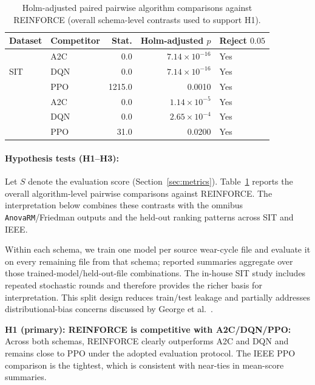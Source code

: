 \documentclass[sn-basic]{sn-jnl} %
\newcommand{\faintcmidrule}[1]{%
	\arrayrulecolor{black!30}%
	\cmidrule{#1}%
	\arrayrulecolor{black}%
}
\begin{document}
\begin{table}[htbp]
	\centering
	\caption{Holm-adjusted paired pairwise algorithm comparisons against \textsc{REINFORCE} (overall schema-level contrasts used to support H1).}
	\label{tab:hyp_tests}
	\begin{tabular}{l l r r l}
	\toprule
	\textbf{Dataset} & \textbf{Competitor} & \textbf{Stat.} & \textbf{Holm-adjusted $p$} & \textbf{Reject $0.05$}\\
	\midrule
	\multirow{3}{*}{SIT}
		& A2C & 0.0 & $7.14\times 10^{-16}$ & Yes\\
		& DQN & 0.0 & $7.14\times 10^{-16}$ & Yes\\
		& PPO & 1215.0 & 0.0010 & Yes\\
	\faintcmidrule{1-5}
	\multirow{3}{*}{IEEE}
		& A2C & 0.0 & $1.14\times 10^{-5}$ & Yes\\
		& DQN & 0.0 & $2.65\times 10^{-4}$ & Yes\\
		& PPO & 31.0 & 0.0200 & Yes\\
	\bottomrule
	\end{tabular}
\end{table}

\paragraph{Hypothesis tests (H1--H3):}
Let $S$ denote the evaluation score (Section~\ref{sec:metrics}). Table~\ref{tab:hyp_tests} reports the overall algorithm-level pairwise comparisons against \textsc{REINFORCE}. The interpretation below combines these contrasts with the omnibus \texttt{AnovaRM}/Friedman outputs and the held-out ranking patterns across SIT and IEEE.

Within each schema, we train one model per source wear-cycle file and evaluate it on every remaining file from that schema; reported summaries aggregate over those trained-model/held-out-file combinations. The in-house SIT study includes repeated stochastic rounds and therefore provides the richer basis for interpretation. This split design reduces train/test leakage and partially addresses distributional-bias concerns discussed by George et al.~\cite{George2025Evaluation}.

\textbf{H1 (primary): \textsc{REINFORCE} is competitive with A2C/DQN/PPO:}
Across both schemas, \textsc{REINFORCE} clearly outperforms \textsc{A2C} and \textsc{DQN} and remains close to \textsc{PPO} under the adopted evaluation protocol. The IEEE \textsc{PPO} comparison is the tightest, which is consistent with near-ties in mean-score summaries.
\end{document}
